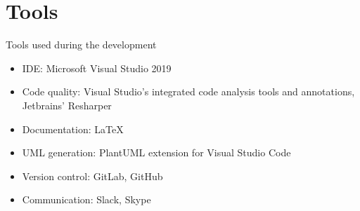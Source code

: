 \section{Tools}
\begin{frame}{Tools used during the development}
\begin{itemize}
	\item{IDE: Microsoft Visual Studio 2019}
	\item{Code quality: Visual Studio’s integrated code analysis tools and annotations, Jetbrains’ Resharper}
	\item{Documentation: LaTeX}
	\item{UML generation: PlantUML extension for Visual Studio Code}
	\item{Version control: GitLab, GitHub}
	\item{Communication: Slack, Skype}
\end{itemize}
\end{frame}